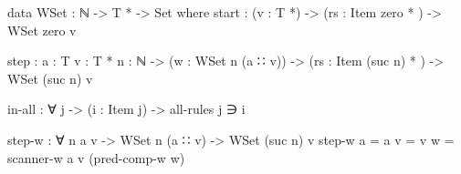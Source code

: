 	\begin{code}

		data WSet : ℕ -> T * -> Set where
		  start :
		    (v : T *) ->
		    (rs : Item zero * ) ->
		    WSet zero v
		
		  step : {a : T} {v : T *} {n : ℕ} ->
		    (w : WSet n (a ∷ v)) ->
		    (rs : Item (suc n) * ) ->
		    WSet (suc n) v

	\end{code}
	
	\begin{code}

		in-all : ∀ {j} -> (i : Item j) -> all-rules j ∋ i

	\end{code}

	\begin{code}

		step-w : ∀ {n a v} ->
		  WSet n (a ∷ v) ->
		  WSet (suc n) v
		step-w {a = a} {v = v} w = scanner-w a v (pred-comp-w w)
	
	\end{code}
